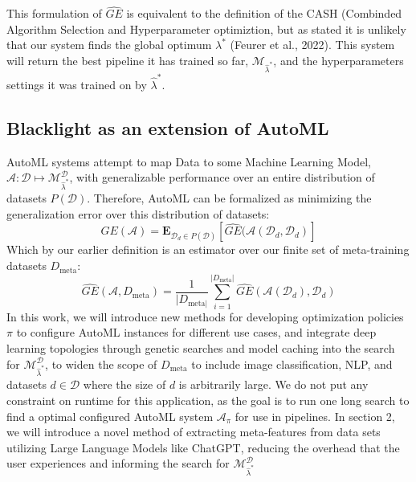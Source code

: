 \documentclass{article}
\begin{document}
This formulation of $\hat{GE}$ is equivalent to the definition of the CASH (Combinded Algorithm Selection and Hyperparameter optimiztion, but as stated it is unlikely that our system finds the global optimum $\lambda^*$  (Feurer et al., 2022). This system will return the best pipeline it has trained so far, $\mathcal{M}_{\hat{\lambda}^*}$, and the hyperparameters settings it was trained on by ${\hat{\lambda}^*}$. 
\subsection{Blacklight as an extension of AutoML} 
AutoML systems attempt to map Data to some Machine Learning Model, $\mathcal{A} : \mathcal{D} \mapsto \mathcal{M}^{\mathcal{D}}_{\hat{\lambda}^*}$, with generalizable performance over an entire distribution of datasets $P(\mathcal{D})$. Therefore, AutoML can be formalized as minimizing the generalization error over this distribution of datasets: 
\begin{equation}
	GE(\mathcal{A}) = \mathbf{E}_{\mathcal{D}_d \in P(\mathcal{D})} [ 	\hat{GE}(\mathcal{A}(\mathcal{D}_d, \mathcal{D}_d)]
\end{equation}
Which by our earlier definition is an estimator over our finite set of meta-training datasets $D_{\text{meta}}$: 
\begin{equation} 
	\hat{GE}(\mathcal{A}, D_{\text{meta}}) = \frac{1}{|D_{\text{meta}|}} \sum\limits_{i = 1}^{|D_{\text{meta}}|} \hat{GE}(\mathcal{A}(\mathcal{D}_d), \mathcal{D}_d)
\end{equation}
In this work, we will introduce new methods for developing optimization policies $\pi$ to configure AutoML instances for different use cases, and integrate deep learning topologies through genetic searches and model caching into the search for $\mathcal{M}^{\mathcal{D}}_{\hat{\lambda}^*}$, to widen the scope of $D_{\text{meta}}$ to include image classification, NLP, and datasets $d \in \mathcal{D}$ where the size of $d$ is arbitrarily large. We do not put any constraint on runtime for this application, as the goal is to run one long search to find a optimal configured AutoML system $\mathcal{A}_\pi$ for use in pipelines. In section 2, we will introduce a novel method of extracting meta-features from data sets utilizing Large Language Models like ChatGPT, reducing the overhead that the user experiences and informing the search for $\mathcal{M}^{\mathcal{D}}_{\hat{\lambda}^*}$
\end{document}
